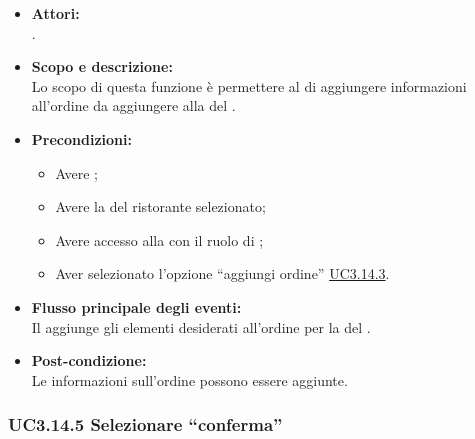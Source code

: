 \begin{itemize}
	\item \textbf{Attori:}
	\\.
	\item \textbf{Scopo e descrizione:} 
	\\Lo scopo di questa funzione è permettere al  di aggiungere informazioni all'ordine da aggiungere alla  del .
	\item \textbf{Precondizioni:}
	\begin{itemize}
		\item Avere ;
		\item Avere la  del ristorante selezionato;
		\item Avere accesso alla  con il ruolo di ;
		\item Aver selezionato l'opzione “aggiungi ordine” \hyperref[UC3.14.3]{UC3.14.3}.
	\end{itemize}
	\item \textbf{Flusso principale degli eventi:}
	\\Il {} aggiunge gli elementi desiderati all'ordine per la  del .
	\item \textbf{Post-condizione:}
	\\Le informazioni sull'ordine possono essere aggiunte.
\end{itemize}

\subsubsection{UC3.14.5 Selezionare “conferma”} \label{UC3.14.5}

